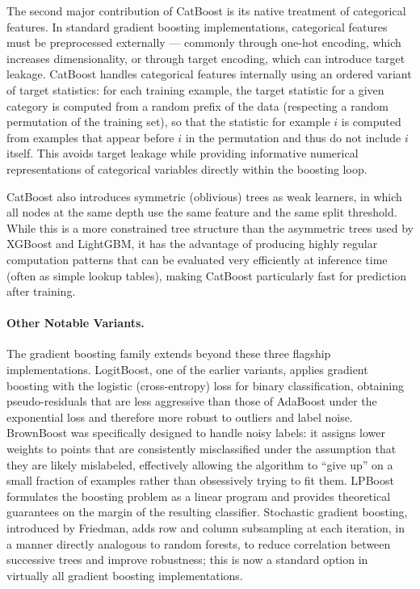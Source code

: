 The second major contribution of CatBoost is its native treatment of categorical features. In standard gradient boosting implementations, categorical features must be preprocessed externally --- commonly through one-hot encoding, which increases dimensionality, or through target encoding, which can introduce target leakage. CatBoost handles categorical features internally using an ordered variant of target statistics: for each training example, the target statistic for a given category is computed from a random prefix of the data (respecting a random permutation of the training set), so that the statistic for example $i$ is computed from examples that appear before $i$ in the permutation and thus do not include $i$ itself. This avoids target leakage while providing informative numerical representations of categorical variables directly within the boosting loop.

CatBoost also introduces symmetric (oblivious) trees as weak learners, in which all nodes at the same depth use the same feature and the same split threshold. While this is a more constrained tree structure than the asymmetric trees used by XGBoost and LightGBM, it has the advantage of producing highly regular computation patterns that can be evaluated very efficiently at inference time (often as simple lookup tables), making CatBoost particularly fast for prediction after training.

\paragraph{Other Notable Variants.}
The gradient boosting family extends beyond these three flagship implementations. LogitBoost, one of the earlier variants, applies gradient boosting with the logistic (cross-entropy) loss for binary classification, obtaining pseudo-residuals that are less aggressive than those of AdaBoost under the exponential loss and therefore more robust to outliers and label noise. BrownBoost was specifically designed to handle noisy labels: it assigns lower weights to points that are consistently misclassified under the assumption that they are likely mislabeled, effectively allowing the algorithm to ``give up'' on a small fraction of examples rather than obsessively trying to fit them. LPBoost formulates the boosting problem as a linear program and provides theoretical guarantees on the margin of the resulting classifier. Stochastic gradient boosting, introduced by Friedman, adds row and column subsampling at each iteration, in a manner directly analogous to random forests, to reduce correlation between successive trees and improve robustness; this is now a standard option in virtually all gradient boosting implementations.

